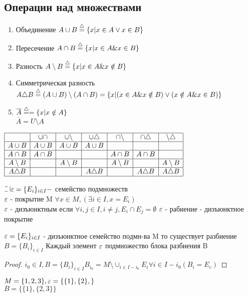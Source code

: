 \subsection{Операции над множествами} 
\begin{enumerate}
	\item Объединение $ A \cup B \defeq \{ x | x\in A \vee x \in B \} $ 
	\item Пересечение $ A \cap B \defeq \{ x | x \in A \& x \in B \}$
	\item Разность $ A \setminus B \defeq \{x| x \in A \& x \notin B \} $
	\item Симметрическая разность $ A \triangle B \defeq (A \cup B) \setminus (A \cap B) = \{ x | (x \in A \& x \notin B) \vee (x \notin A \& x \in B)  \}$ 
	\item $ \overline{A} \defeq =  \{ x | x \notin A \} $ \\
	$ \overline{A} = U \setminus A $
\end{enumerate}
$
\begin{array}{|c|c|c|c|c|c|c|}
	\hline 
	& \cup \cap  & \cup \setminus  & \cup \triangle  & \cap \setminus & \cap \triangle & \setminus \triangle  \\ 
	\hline 
	A \cup B & A \cup B & A \cup B  & A \cup B  &  &  &  \\ 
	\hline 
	A \cap B& A \cap B &  &  & A \cap B & A \cap B &  \\ 
	\hline 
	A \setminus B &  & A \setminus B &  & A \setminus B &  &  A \setminus B\\ 
	\hline 
	A \triangle B &  &  & A \triangle B  &  & A \triangle B  & A \triangle B   \\ 
	\hline 

\end{array} 
$



$ \letus \eps = \{ E_i \}_{i\in I} - $ семейство подмножеств \\
$ \varepsilon $ - покрытие M $ \forall x \in M, (\exists i \in I, x = E_i) $ \\
$ \varepsilon $ - дизъюнктным если $ \forall i, j \in I, i \neq j, E_i \cap E_j = \emptyset $
$ \varepsilon $ - рабиение - дизъюнктное покрытие \\

\begin{theorem}
	$ \varepsilon = \{ E_i \}_{i\in I} $ - дизъюнктное семейство подмн-ва M то существует разбиение $ B = \{ B_i \}_{i\in I} $ Каждый элемент  $ \varepsilon $ подмножество блока разбиения B 
	\begin{proof}
		$ i_0 \in I, B = \{ B_i \}_{i\in I} B_{i_0} = M \setminus \cup_{i\in I - i_0} E_i  \forall i \in I - i_0 ( B_i = E_c) $ 
	\end{proof}
\end{theorem}
$ M = \{1,2,3\}, \varepsilon = \{\{ 1 \}, \{2\}, \} $ \\
$ B = \{ \{1\}, \{ 2,3\} \} $ \\

